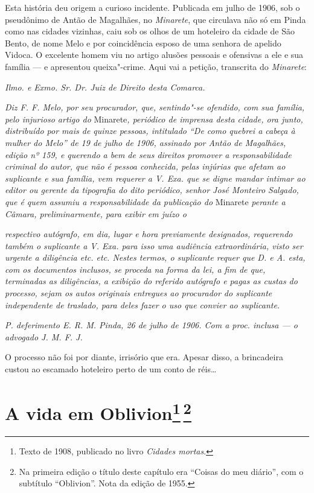 Esta história deu origem a curioso incidente. Publicada em julho de
1906, sob o pseudônimo de Antão de Magalhães, no \emph{Minarete}, que
circulava não só em Pinda como nas cidades vizinhas, caiu sob os olhos
de um hoteleiro da cidade de São Bento, de nome Melo e por coincidência
esposo de uma senhora de apelido Vidoca. O excelente homem viu no artigo
alusões pessoais e ofensivas a ele e sua família --- e apresentou
queixa"-crime. Aqui vai a petição, transcrita do \emph{Minarete}:

\emph{Ilmo. e Exmo. Sr. Dr. Juiz de Direito desta Comarca.}

\emph{Diz F. F. Melo, por seu procurador, que, sentindo"-se ofendido, com
sua família, pelo injurioso artigo do} Minarete\emph{, periódico de
imprensa desta cidade, ora junto, distribuído por mais de quinze
pessoas, intitulado ``De como quebrei a cabeça à mulher do Melo'' de 19
de julho de 1906, assinado por Antão de Magalhães, edição nº 159, e
querendo a bem de seus direitos promover a responsabilidade criminal do
autor, que não é pessoa conhecida, pelas injúrias que afetam ao
suplicante e sua família, vem requerer a V. Exa. que se digne mandar
intimar ao editor ou gerente da tipografia do dito periódico, senhor
José Monteiro Salgado, que é quem assumiu a responsabilidade da
publicação do} Minarete \emph{perante a Câmara, preliminarmente, para
exibir em juízo o}

\emph{respectivo autógrafo, em dia, lugar e hora previamente designados,
requerendo também o suplicante a V. Exa. para isso uma audiência
extraordinária, visto ser urgente a diligência etc. etc. Nestes termos,
o suplicante requer que D. e A. esta, com os documentos inclusos, se
proceda na forma da lei, a fim de que, terminadas as diligências, a
exibição do referido autógrafo e pagas as custas do processo, sejam os
autos originais entregues ao procurador do suplicante independente de
traslado, para deles fazer o uso que convier ao suplicante.}

\emph{P. deferimento E. R. M. Pinda, 26 de julho de 1906. Com a proc.
inclusa --- o advogado J. M. F. J.}

O processo não foi por diante, irrisório que era. Apesar disso, a
brincadeira custou ao escamado hoteleiro perto de um conto de réis\ldots{}

\chapter{A vida em Oblivion\footnote[*]{Texto de 1908, publicado no livro \emph{Cidades mortas}.}\,\footnote[**]{Na primeira edição o
  título deste capítulo era ``Coisas do meu diário'', com o subtítulo
  ``Oblivion''. Nota da edição de 1955.}}


